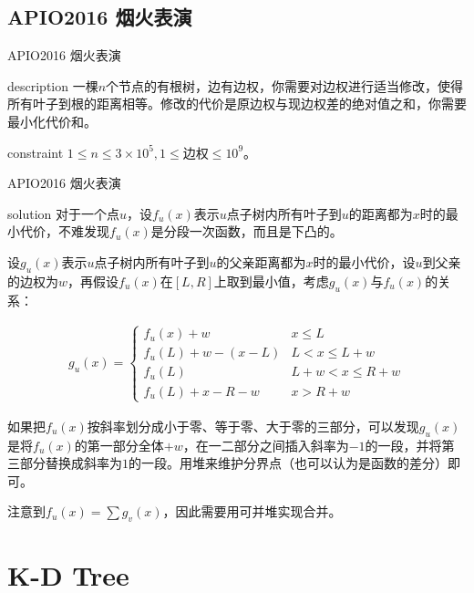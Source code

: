 \documentclass{beamer}
\begin{document}
\subsection{APIO2016 烟火表演}
\begin{frame}{APIO2016 烟火表演}
\begin{block}{description}
一棵$n$个节点的有根树，边有边权，你需要对边权进行适当修改，使得所有叶子到根的距离相等。修改的代价是原边权与现边权差的绝对值之和，你需要最小化代价和。
\end{block}
\begin{block}{constraint}
$1 \le n \le 3\times 10^5, 1 \le \mbox{边权}\le 10^9$。

\end{block}
\end{frame}
\begin{frame}{APIO2016 烟火表演}
\begin{block}{solution}
	对于一个点$u$，设$f_u(x)$表示$u$点子树内所有叶子到$u$的距离都为$x$时的最小代价，不难发现$f_u(x)$是分段一次函数，而且是下凸的。
	
	设$g_u(x)$表示$u$点子树内所有叶子到$u$的父亲距离都为$x$时的最小代价，设$u$到父亲的边权为$w$，再假设$f_u(x)$在$[L,R]$上取到最小值，考虑$g_u(x)$与$f_u(x)$的关系：
	
	$$
	\begin{aligned}
	g_u(x)=\begin{cases}
	f_u(x)+w &  x \le L\\
	f_u(L)+w-(x-L)& L < x \le L+w\\
	f_u(L)& L+w < x \le R+w\\
	f_u(L)+x-R-w& x > R+w
	\end{cases}
	\end{aligned}
	$$
	
	如果把$f_u(x)$按斜率划分成小于零、等于零、大于零的三部分，可以发现$g_u(x)$是将$f_u(x)$的第一部分全体$+w$，在一二部分之间插入斜率为$-1$的一段，并将第三部分替换成斜率为$1$的一段。用堆来维护分界点（也可以认为是函数的差分）即可。
	
	注意到$f_u(x)=\sum g_v(x)$，因此需要用可并堆实现合并。
\end{block}
\end{frame}
\section{K-D Tree}
\end{document}
